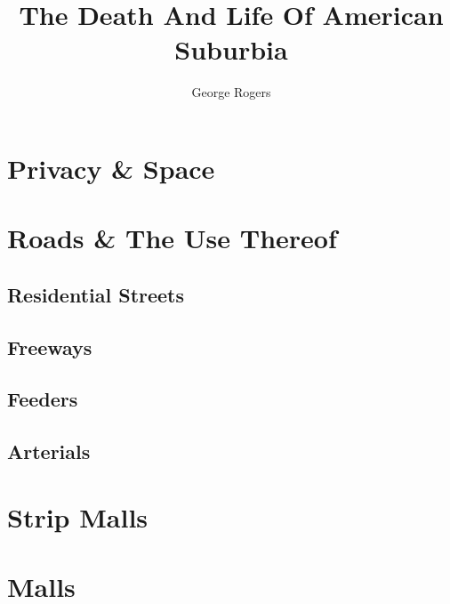 \documentclass[8pt]{amsbook}
\title{The Death And Life Of American Suburbia}
\author{George Rogers}
\begin{document}
\dominitoc
\maketitle

\tableofcontents
\chapter{Privacy \& Space}
\chapter{Roads \& The Use Thereof}
\section{Residential Streets}
\section{Freeways}
\section{Feeders}
\section{Arterials}
\chapter{Strip Malls}
\chapter{Malls}
\listoffigures
\end{document}
